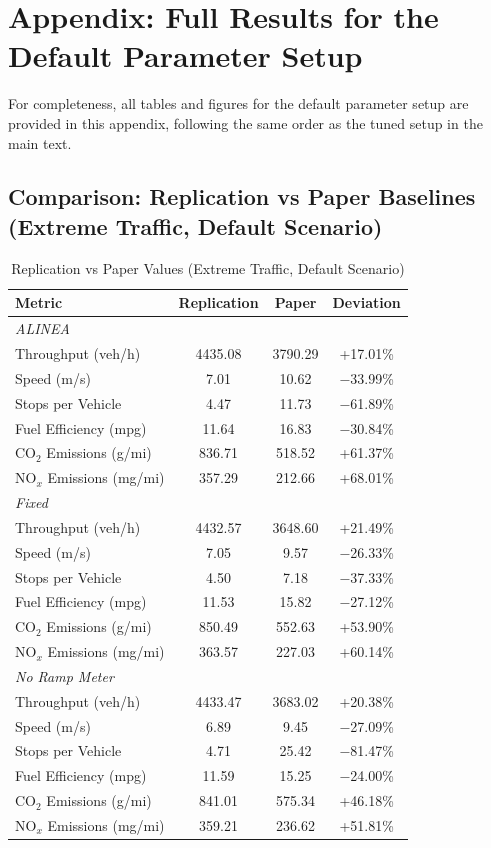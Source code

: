 \clearpage
\appendix
\section{Appendix: Full Results for the Default Parameter Setup}

For completeness, all tables and figures for the default parameter setup are provided in this appendix, following the same order as the tuned setup in the main text.

\subsection{Comparison: Replication vs Paper Baselines (Extreme Traffic, Default Scenario)}

\begin{table}[H]
\centering
\small
\caption{Replication vs Paper Values (Extreme Traffic, Default Scenario)}
\begin{tabular}{l c c c}
\toprule
\textbf{Metric} & \textbf{Replication} & \textbf{Paper} & \textbf{Deviation} \\
\midrule
\multicolumn{4}{l}{\textit{ALINEA}} \\
\midrule
Throughput (veh/h)       & 4435.08 & 3790.29 & +17.01\% \\
Speed (m/s)              & 7.01    & 10.62   & $-$33.99\% \\
Stops per Vehicle        & 4.47    & 11.73   & $-$61.89\% \\
Fuel Efficiency (mpg)    & 11.64   & 16.83   & $-$30.84\% \\
CO$_2$ Emissions (g/mi)  & 836.71  & 518.52  & +61.37\% \\
NO$_x$ Emissions (mg/mi) & 357.29  & 212.66  & +68.01\% \\
\midrule
\multicolumn{4}{l}{\textit{Fixed}} \\
\midrule
Throughput (veh/h)       & 4432.57 & 3648.60 & +21.49\% \\
Speed (m/s)              & 7.05    & 9.57    & $-$26.33\% \\
Stops per Vehicle        & 4.50    & 7.18    & $-$37.33\% \\
Fuel Efficiency (mpg)    & 11.53   & 15.82   & $-$27.12\% \\
CO$_2$ Emissions (g/mi)  & 850.49  & 552.63  & +53.90\% \\
NO$_x$ Emissions (mg/mi) & 363.57  & 227.03  & +60.14\% \\
\midrule
\multicolumn{4}{l}{\textit{No Ramp Meter}} \\
\midrule
Throughput (veh/h)       & 4433.47 & 3683.02 & +20.38\% \\
Speed (m/s)              & 6.89    & 9.45    & $-$27.09\% \\
Stops per Vehicle        & 4.71    & 25.42   & $-$81.47\% \\
Fuel Efficiency (mpg)    & 11.59   & 15.25   & $-$24.00\% \\
CO$_2$ Emissions (g/mi)  & 841.01  & 575.34  & +46.18\% \\
NO$_x$ Emissions (mg/mi) & 359.21  & 236.62  & +51.81\% \\
\bottomrule
\end{tabular}
\end{table}

